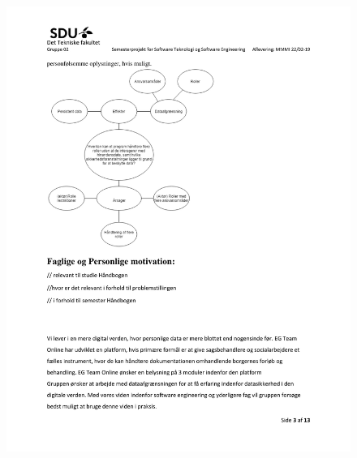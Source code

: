 \begin{figure}[hb]
  \includegraphics[scale = 0.33]{./PNG/Projektforslag/Projektforslag-03.jpg} 
\end{figure}

